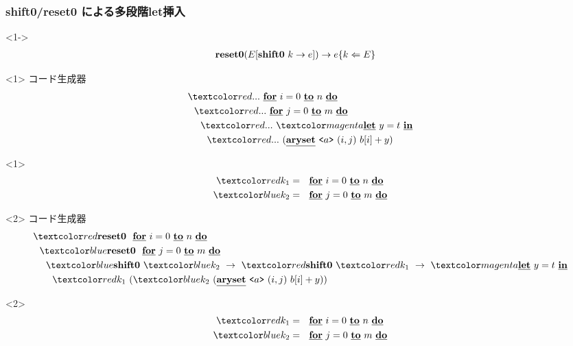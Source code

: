 \begin{frame}
  \frametitle{shift0/reset0 による多段階let挿入}
  \begin{onlyenv}<1->
    \begin{align*}
      \textbf{reset0} (E[\textbf{shift0}~ k \to e]) &\to e \{{k}\Leftarrow{E}\}
    \end{align*}
  \end{onlyenv}

  \begin{onlyenv}<1>
    コード生成器
    \begin{align*}
      & \red{...}~ \cfordo{i = 0}{n} \\
      & ~~\red{...}~ \cfordo{j = 0}{m} \\
      & ~~~~\red{...}~ \magenta{\cLet~y=t~\cIn} \\
      & ~~~~~~\red{...}~ (\caryset{\code{a}}{(i,j)}{b[i] + y})
    \end{align*}

    \begin{invisibleenv}<1>
      \begin{align*}
        \red{k_1} &= ~~\cfordo{i = 0}{n} \\
        \blue{k_2} &= ~~\cfordo{j = 0}{m} \\
      \end{align*}
    \end{invisibleenv}
  \end{onlyenv}

  \begin{onlyenv}<2>
    コード生成器
    \begin{align*}
      & \red{\Resetz} ~~\cfordo{i = 0}{n} \\
      & ~~\blue{\Resetz} ~~\cfordo{j = 0}{m} \\
      & ~~~~\blue{\Shiftz}~\blue{k_2}~\to~ \red{\Shiftz}~\red{k_1}~\to~ \magenta{\cLet~y=t~\cIn} \\
      & ~~~~~~\red{k_1}~(\blue{k_2}~(\caryset{\code{a}}{(i,j)}{b[i] + y}))
    \end{align*}
    \begin{invisibleenv}<2>
      \begin{align*}
        \red{k_1} &= ~~\cfordo{i = 0}{n} \\
        \blue{k_2} &= ~~\cfordo{j = 0}{m} \\
      \end{align*}
    \end{invisibleenv}
  \end{onlyenv}


\end{frame}
